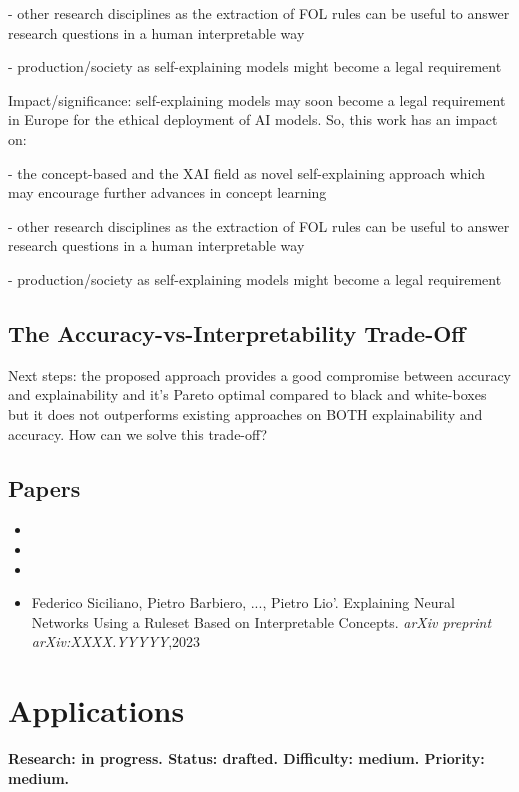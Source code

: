 \documentclass[withindex,glossary]{cam-thesis}
\theoremstyle{plain}
\theoremstyle{definition}
\theoremstyle{remark}
\begin{document}
- other research disciplines as the extraction of FOL rules can be useful to answer research questions in a human interpretable way

- production/society as self-explaining models might become a legal requirement


Impact/significance: self-explaining models may soon become a legal requirement in Europe for the ethical deployment of AI models. So, this work has an impact on:

- the concept-based and the XAI field as novel self-explaining approach which may encourage further advances in concept learning

- other research disciplines as the extraction of FOL rules can be useful to answer research questions in a human interpretable way

- production/society as self-explaining models might become a legal requirement


\section{The Accuracy-vs-Interpretability Trade-Off}
Next steps: the proposed approach provides a good compromise between accuracy and explainability and it's Pareto optimal compared to black and white-boxes but it does not outperforms existing approaches on BOTH explainability and accuracy. How can we solve this trade-off?



\section*{Papers}
\nobibliography*
\begin{itemize}
    \item {}
    \item {}
    \item {}
    \item Federico Siciliano, Pietro Barbiero, ..., Pietro Lio'. Explaining Neural Networks Using a Ruleset Based on Interpretable Concepts. \textit{arXiv preprint arXiv:XXXX.YYYYY},2023
\end{itemize}




\chapter{Applications} \label{chapter:applications}
\textbf{Research: in progress. Status: drafted. Difficulty: medium. Priority: medium.}
\end{document}
